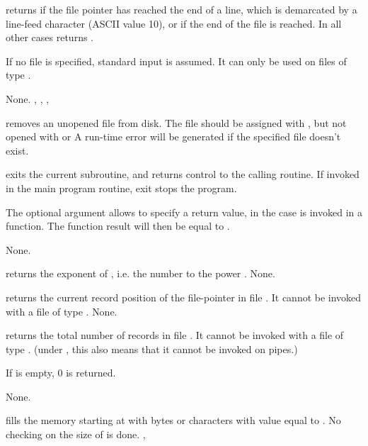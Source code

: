 \documentclass{report}
\begin{document}


{ returns  if the file pointer has reached the end of a
line, which is demarcated by a line-feed character (ASCII value 10), or if
the end of the file is reached.
In all other cases  returns .

If no file  is specified, standard input is assumed.
It can only be used on files of type .}
{None.}
{, , , }



{ removes an unopened file from disk. The file should be
assigned with , but not opened with  or }
{A run-time error will be generated if the specified file doesn't exist.}
{}



{ exits the current subroutine, and returns control to the calling
routine. If invoked in the main program routine, exit stops the program.

The optional argument  allows to specify a return value, in the case
 is invoked in a function. The function result will then be
equal to .}
{None.}
{}



{ returns the exponent of , i.e. the number  to the
power .}
{None.}{}



{ returns the current record position of the file-pointer in file
. It cannot be invoked with a file of type .}
{None.}
{}



{ returns the total number of records in file . 
It cannot be invoked with a file of type . (under \linux, this
also means that it cannot be invoked on pipes.)

If  is empty, 0 is returned.
}
{None.}
{}



{ fills the memory starting at  with  bytes
or characters with value equal to .
}
{No checking on the size of  is done.}
{, }
\end{document}

